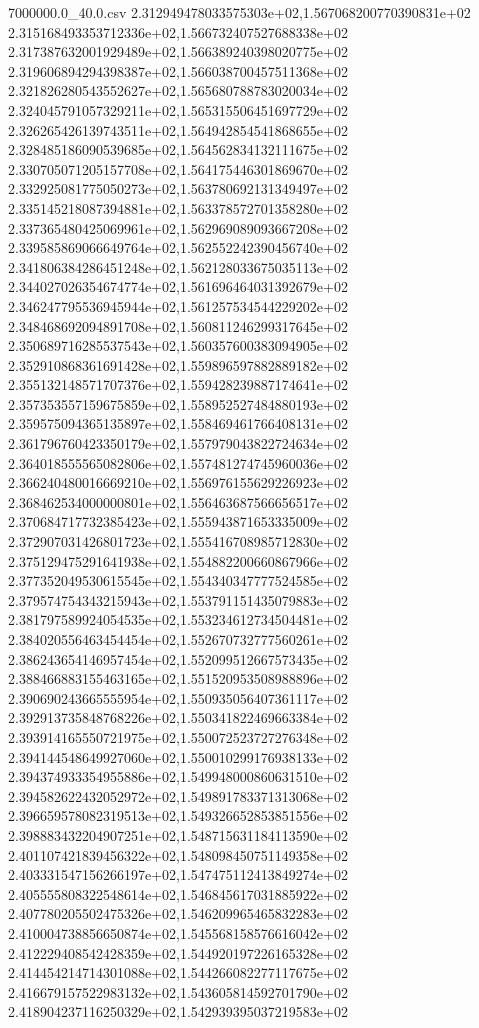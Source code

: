 \begin{filecontents*}{7000000.0_40.0.csv}
2.312949478033575303e+02,1.567068200770390831e+02
2.315168493353712336e+02,1.566732407527688338e+02
2.317387632001929489e+02,1.566389240398020775e+02
2.319606894294398387e+02,1.566038700457511368e+02
2.321826280543552627e+02,1.565680788783020034e+02
2.324045791057329211e+02,1.565315506451697729e+02
2.326265426139743511e+02,1.564942854541868655e+02
2.328485186090539685e+02,1.564562834132111675e+02
2.330705071205157708e+02,1.564175446301869670e+02
2.332925081775050273e+02,1.563780692131349497e+02
2.335145218087394881e+02,1.563378572701358280e+02
2.337365480425069961e+02,1.562969089093667208e+02
2.339585869066649764e+02,1.562552242390456740e+02
2.341806384286451248e+02,1.562128033675035113e+02
2.344027026354674774e+02,1.561696464031392679e+02
2.346247795536945944e+02,1.561257534544229202e+02
2.348468692094891708e+02,1.560811246299317645e+02
2.350689716285537543e+02,1.560357600383094905e+02
2.352910868361691428e+02,1.559896597882889182e+02
2.355132148571707376e+02,1.559428239887174641e+02
2.357353557159675859e+02,1.558952527484880193e+02
2.359575094365135897e+02,1.558469461766408131e+02
2.361796760423350179e+02,1.557979043822724634e+02
2.364018555565082806e+02,1.557481274745960036e+02
2.366240480016669210e+02,1.556976155629226923e+02
2.368462534000000801e+02,1.556463687566656517e+02
2.370684717732385423e+02,1.555943871653335009e+02
2.372907031426801723e+02,1.555416708985712830e+02
2.375129475291641938e+02,1.554882200660867966e+02
2.377352049530615545e+02,1.554340347777524585e+02
2.379574754343215943e+02,1.553791151435079883e+02
2.381797589924054535e+02,1.553234612734504481e+02
2.384020556463454454e+02,1.552670732777560261e+02
2.386243654146957454e+02,1.552099512667573435e+02
2.388466883155463165e+02,1.551520953508988896e+02
2.390690243665555954e+02,1.550935056407361117e+02
2.392913735848768226e+02,1.550341822469663384e+02
2.393914165550721975e+02,1.550072523727276348e+02
2.394144548649927060e+02,1.550010299176938133e+02
2.394374933354955886e+02,1.549948000860631510e+02
2.394582622432052972e+02,1.549891783371313068e+02
2.396659578082319513e+02,1.549326652853851556e+02
2.398883432204907251e+02,1.548715631184113590e+02
2.401107421839456322e+02,1.548098450751149358e+02
2.403331547156266197e+02,1.547475112413849274e+02
2.405555808322548614e+02,1.546845617031885922e+02
2.407780205502475326e+02,1.546209965465832283e+02
2.410004738856650874e+02,1.545568158576616042e+02
2.412229408542428359e+02,1.544920197226165328e+02
2.414454214714301088e+02,1.544266082277117675e+02
2.416679157522983132e+02,1.543605814592701790e+02
2.418904237116250329e+02,1.542939395037219583e+02

\end{filecontents*}
